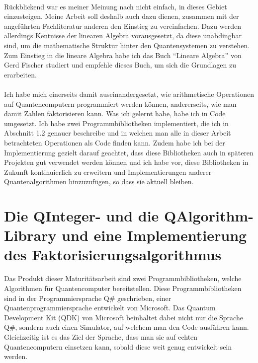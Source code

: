 \paragraph{}

Rückblickend war es meiner Meinung nach nicht einfach, in dieses Gebiet einzusteigen. Meine Arbeit soll deshalb auch dazu dienen, zusammen mit der angeführten Fachliteratur anderen den Einstieg zu vereinfachen. Dazu werden allerdings Kentnisse der linearen Algebra vorausgesetzt, da diese unabdingbar sind, um die mathematische Struktur hinter den Quantensystemen zu verstehen. Zum Einstieg in die lineare Algebra habe ich das Buch "`Lineare Algebra"' von Gerd Fischer \cite{LA} studiert und empfehle dieses Buch, um sich die Grundlagen zu erarbeiten.

\paragraph{}

Ich habe mich einerseits damit auseinandergesetzt, wie arithmetische Operationen auf Quantencomputern programmiert werden können, andererseits, wie man damit Zahlen faktorisieren kann. Was ich gelernt habe, habe ich in Code umgesetzt. Ich habe zwei Programmbibliotheken implementiert, die ich in Abschnitt 1.2 genauer beschreibe und in welchen man alle in dieser Arbeit betrachteten Operationen als Code finden kann.  Zudem habe ich bei der Implementierung gezielt darauf geachtet, dass diese Bibliotheken auch in späteren Projekten gut verwendet werden können und ich habe vor, diese Bibliotheken in Zukunft kontinuierlich zu erweitern und Implementierungen anderer Quantenalgorithmen hinzuzufügen, so dass sie aktuell bleiben. 

\section{Die QInteger- und die QAlgorithm-Library und eine Implementierung des Faktorisierungsalgorithmus}
Das Produkt dieser Maturitätsarbeit sind zwei Programmbibliotheken, welche Algorithmen für Quantencomputer bereitstellen. Diese Programmbibliotheken sind in der Programmiersprache Q\# geschrieben, einer Quantenprogrammiersprache entwickelt von Microsoft. Das Quantum Development Kit (QDK) von Microsoft beinhaltet dabei nicht nur die Sprache Q\#, sondern auch einen Simulator, auf welchem man den Code ausführen kann. Gleichzeitig ist es das Ziel der Sprache, dass man sie auf echten Quantencomputern einsetzen kann, sobald diese weit genug entwickelt sein werden.
